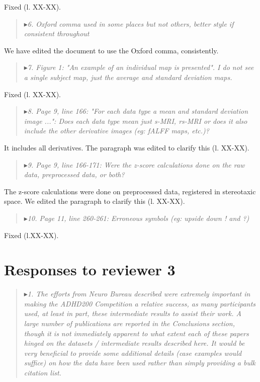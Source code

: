 \documentclass[authoryear,3p]{elsarticle}
\begin{document}
Fixed (l. XX-XX).

\begin{quote}
$\blacktriangleright$\emph{6. Oxford comma used in some places but not others, better style if consistent throughout}
\end{quote}

We have edited the document to use the Oxford comma, consistently.

\begin{quote}
$\blacktriangleright$\emph{7. Figure 1: "An example of an individual map is presented". I do not see a single subject map, just the average and standard deviation maps.}
\end{quote}

Fixed (l. XX-XX). 

\begin{quote}
$\blacktriangleright$\emph{8.  Page 9, line 166: "For each data type a mean and standard deviation image ...": Does each data type mean just {s-MRI, rs-MRI} or does it also include the other derivative images (eg: fALFF maps, etc.)?}
\end{quote}

It includes all derivatives. The paragraph was edited to clarify this (l. XX-XX). 

\begin{quote}
$\blacktriangleright$\emph{9. Page 9, line 166-171: Were the z-score calculations done on the raw data, preprocessed data, or both?}
\end{quote}

The z-score calculations were done on preprocessed data, registered in stereotaxic space. We edited the paragraph to clarify this (l. XX-XX). 

\begin{quote}
$\blacktriangleright$\emph{10. Page 11, line 260-261: Erroneous symbols (eg: upside down ! and ?)}
\end{quote}

Fixed (l.XX-XX).

\section{Responses to reviewer 3}

\begin{quote}
$\blacktriangleright$\emph{1. The efforts from Neuro Bureau described were extremely important in making the ADHD200 Competition a relative success, as many participants used, at least in part, these intermediate results to assist their work. A large number of publications are reported in the Conclusions section, though it is not immediately apparent to what extent each of these papers hinged on the datasets / intermediate results described here.  It would be very beneficial to provide some additional details (case examples would suffice) on how the data have been used rather than simply providing a bulk citation list. 
}
\end{quote}
\end{document}
